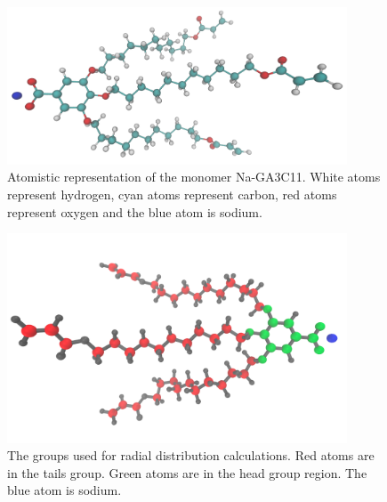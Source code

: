 \documentclass[journal=jpcbfk,manusciprt=article]{achemso}
\begin{document}
  \begin{figure}[!htb]
	\centering
        \includegraphics[width=0.9\textwidth]{monomer.png}
	\caption{Atomistic representation of the monomer Na-GA3C11. White atoms
		represent hydrogen, cyan atoms represent carbon, red atoms represent oxygen and
		the blue atom is sodium.}\label{fig:monomer}
  \end{figure}

  \begin{figure}[!htb]
	\centering
        \includegraphics[width=0.9\textwidth]{monomer_color_coded.png}
	\caption{The groups used for radial distribution calculations. Red atoms are in the
		tails group. Green atoms are in the head group region. The blue atom is sodium. 
		}\label{fig:monomer_color_coded}
  \end{figure}
  
\end{document}
